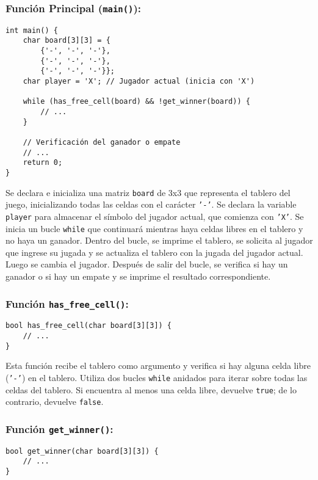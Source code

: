 \subsubsection{Función Principal (\texttt{main()}):}

\begin{verbatim}
int main() {
    char board[3][3] = {
        {'-', '-', '-'}, 
        {'-', '-', '-'}, 
        {'-', '-', '-'}};
    char player = 'X'; // Jugador actual (inicia con 'X')

    while (has_free_cell(board) && !get_winner(board)) {
        // ...
    }

    // Verificación del ganador o empate
    // ...
    return 0;
}
\end{verbatim}

Se declara e inicializa una matriz \texttt{board} de 3x3 que representa el tablero del juego, inicializando todas las celdas con el carácter \texttt{'-'}. Se declara la variable \texttt{player} para almacenar el símbolo del jugador actual, que comienza con \texttt{'X'}. Se inicia un bucle \texttt{while} que continuará mientras haya celdas libres en el tablero y no haya un ganador. Dentro del bucle, se imprime el tablero, se solicita al jugador que ingrese su jugada y se actualiza el tablero con la jugada del jugador actual. Luego se cambia el jugador. Después de salir del bucle, se verifica si hay un ganador o si hay un empate y se imprime el resultado correspondiente.

\subsubsection{Función \texttt{has\_free\_cell()}:}

\begin{verbatim}
bool has_free_cell(char board[3][3]) {
    // ...
}
\end{verbatim}

Esta función recibe el tablero como argumento y verifica si hay alguna celda libre (\texttt{'-'}) en el tablero. Utiliza dos bucles \texttt{while} anidados para iterar sobre todas las celdas del tablero. Si encuentra al menos una celda libre, devuelve \texttt{true}; de lo contrario, devuelve \texttt{false}.

\subsubsection{Función \texttt{get\_winner()}:}

\begin{verbatim}
bool get_winner(char board[3][3]) {
    // ...
}
\end{verbatim}

